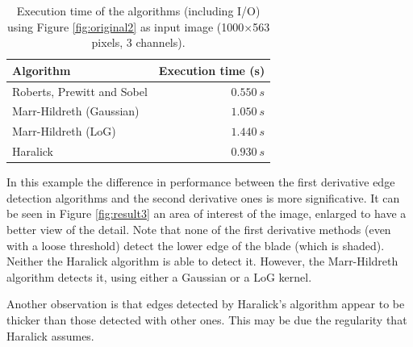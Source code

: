 \documentclass{ipol}
\numberwithin{equation}{section}
\numberwithin{table}{section}
\begin{document}
\begin{table}[t!]
	\begin{center}
	\begin{tabular}{| l | r |}
		\hline \rule{0pt}{3ex}
		\cellcolor[gray]{0.8} \textbf{Algorithm}	& \cellcolor[gray]{0.8} \textbf{Execution time (s)}	\\ \hline \rule{0pt}{3ex}
		Roberts, Prewitt and Sobel					& $0.550 \ s$										\\ \hline \rule{0pt}{3ex}
		Marr-Hildreth (Gaussian)					& $1.050 \ s$										\\ \hline \rule{0pt}{3ex}
		Marr-Hildreth (LoG)							& $1.440 \ s$										\\ \hline \rule{0pt}{3ex}
		Haralick									& $0.930 \ s$										\\
		\hline
	\end{tabular}
	\end{center}
	\caption{Execution time of the algorithms (including I/O) using Figure \ref{fig:original2} as input image (1000$\times$563 pixels, 3 channels).}
	\label{exectime2}
\end{table}

In this example the difference in performance between the first derivative edge detection algorithms and the second derivative ones is more significative. It can be seen in Figure \ref{fig:result3} an area of ​​interest of the image, enlarged to have a better view of the detail. Note that none of the first derivative methods (even with a loose threshold) detect the lower edge of the blade (which is shaded). Neither the Haralick algorithm is able to detect it. However, the Marr-Hildreth algorithm detects it, using either a Gaussian or a LoG kernel. 

Another observation is that edges detected by Haralick's algorithm appear to be thicker than those detected with other ones. This may be due the regularity that Haralick assumes. 
\end{document}
